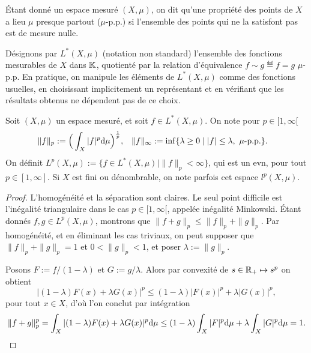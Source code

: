 Étant donné un espace mesuré $(X,\mu)$, on dit qu'une propriété des points de $X$ a lieu $\mu$ presque partout ($\mu$-p.p.) si l'ensemble des points qui ne la satisfont pas est de mesure nulle. 

Désignons par $L^*(X,\mu)$ (notation non standard) l'ensemble des fonctions mesurables de $X$ dans $\mathbb{K}$, quotienté par la relation d'équivalence $f\sim g \eqdef f=g$ $\mu$-p.p. 
En pratique, on manipule les éléments de $L^*(X,\mu)$ comme des fonctions usuelles, en choisissant implicitement un représentant et en vérifiant que les résultats obtenus ne dépendent pas de ce choix. %

\begin{definition}
\label{def:normeLp}
%
	Soit $(X,\mu)$ un espace mesuré, et soit $f \in L^*(X,\mu)$. On note pour $p\in [1,\infty[$
	\begin{align}
		\|f\|_p &:= \Big(\int_X |f|^p \mathrm{d} \mu\Big)^\frac 1 p, &
		\|f\|_\infty &:= \inf\{\lambda \geq 0 \mid |f| \leq \lambda, \ \mu\text{-p.p.}\}.
	\end{align}
	On définit $L^p(X,\mu) := \{f \in L^*(X,\mu) \mid \|f\|_p < \infty\}$, qui est un evn, pour tout $p \in [1,\infty]$. Si $X$ est fini ou dénombrable, on note parfois cet espace $l^p(X,\mu)$.
\end{definition}

\begin{proof}
L'homogénéité et la séparation sont claires.
Le seul point difficile est l'inégalité triangulaire dans le cas $p\in [1,\infty[$, appelée inégalité Minkowski.
Étant donnés $f,g \in L^p(X,\mu)$, montrons que $\|f+g\|_p \leq \|f\|_p + \|g\|_p$. Par homogénéité, et en éliminant les cas triviaux, on peut supposer que $\|f\|_p + \|g\|_p = 1$ et $0 < \|g\|_p < 1$, et poser $\lambda := \|g\|_p$. 

Posons $F := f/(1-\lambda)$ et $G := g/\lambda$. Alors par convexité de $s\in \mathbb{R}_+ \mapsto s^p$ on obtient
\begin{equation}
	|(1-\lambda) F(x)+\lambda G(x)|^p \leq (1-\lambda) |F(x)|^p+\lambda |G(x)|^p,
\end{equation}
pour tout $x \in X$, d'où l'on conclut par intégration
\begin{equation*}
	\|f+g\|_p^p = \int_X |(1-\lambda) F(x)+\lambda G(x)|^p \mathrm{d} \mu \leq (1-\lambda) \int_X |F|^p \mathrm{d} \mu + \lambda \int_X |G|^p \mathrm{d} \mu = 1.
\qedhere
\end{equation*}
\end{proof}

